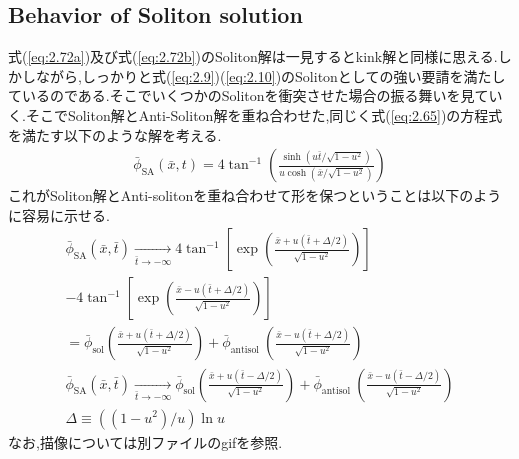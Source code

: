 \documentclass[dvipdfmx,11pt,a4paper,oneside,openany]{jsbook}
\begin{document}
\subsection{Behavior of Soliton solution}
式(\ref{eq:2.72a})及び式(\ref{eq:2.72b})のSoliton解は一見するとkink解と同様に思える.しかしながら,しっかりと式(\ref{eq:2.9})(\ref{eq:2.10})のSolitonとしての強い要請を満たしているのである.そこでいくつかのSolitonを衝突させた場合の振る舞いを見ていく.そこでSoliton解とAnti-Soliton解を重ね合わせた,同じく式(\ref{eq:2.65})の方程式を満たす以下のような解を考える.
\begin{align}
    \bar{\phi}_{\mathrm{SA}}(\bar{x}, t)=4 \tan ^{-1}\left(\frac{\sinh \left(u \bar{t} / \sqrt{1-u^{2}}\right)}{u \cosh \left(\bar{x} / \sqrt{1-u^{2}}\right)}\right)
\end{align}
これがSoliton解とAnti-solitonを重ね合わせて形を保つということは以下のように容易に示せる.
\begin{align}
    \bar{\phi}_{\mathrm{SA}}(\bar{x}, \bar{t}) \underset{\bar{t} \rightarrow-\infty}{\longrightarrow} 4 \tan ^{-1}\left[\exp \left(\frac{\bar{x}+u(\bar{t}+\Delta / 2)}{\sqrt{1-u^{2}}}\right)\right]\nonumber                                                                                  \\
    -4 \tan ^{-1}\left[\exp \left(\frac{\bar{x}-u(\bar{t}+\Delta / 2)}{\sqrt{1-u^{2}}}\right)\right]\nonumber                                                                                                                                                                                   \\
    =\bar{\phi}_{\mathrm{sol}}\left(\frac{\bar{x}+u(\bar{t}+\Delta / 2)}{\sqrt{1-u^{2}}}\right)+\bar{\phi}_{\text {antisol }}\left(\frac{\bar{x}-u(\bar{t}+\Delta / 2)}{\sqrt{1-u^{2}}}\right)                                                                                                  \\
    \bar{\phi}_{\mathrm{SA}}(\bar{x}, \bar{t}) \underset{\bar{t} \rightarrow-\infty}{\longrightarrow} \bar{\phi}_{\mathrm{sol}}\left(\frac{\bar{x}+u(\bar{t}-\Delta / 2)}{\sqrt{1-u^{2}}}\right)+\bar{\phi}_{\text {antisol }}\left(\frac{\bar{x}-u(\bar{t}-\Delta / 2)}{\sqrt{1-u^{2}}}\right) \\
    \Delta \equiv\left(\left(1-u^{2}\right) / u\right) \ln u
\end{align}
なお,描像については別ファイルのgifを参照.
\end{document}
